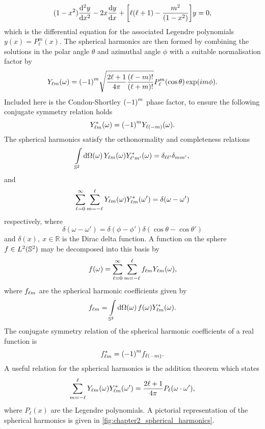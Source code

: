 %
\begin{equation}
	(1-x^{2}) \dv[2]{y}{x} - 2x\dv{y}{x} + \bigg[\ell(\ell+1) - \frac{m^{2}}{(1 - x^{2})}\bigg] y
	= 0,
\end{equation}
%
which is the differential equation for the associated Legendre polynomials \(y(x) = P^{m}_{\ell}(x)\).
The spherical harmonics are then formed by combining the solutions in the polar angle \(\theta{}\) and azimuthal angle \(\phi{}\) with a suitable normalisation factor by
%
\begin{equation}
	\pixel{\harmonic{Y}}
	= \phaseFactor \sqrt{\factor \frac{(\ell-m)!}{(\ell+m)!}} P^{m}_{\ell}(\cos{\theta}) \exp(i m\phi).
\end{equation}
%
Included here is the Condon-Shortley \(\phaseFactor{}\) phase factor, to ensure the following conjugate symmetry relation holds
%
\begin{equation}
	\pixel{\conj{\harmonic{Y}}}
	= \phaseFactor \pixel{Y_{\ell(-m)}}.
\end{equation}
%
The spherical harmonics satisfy the orthonormality and completeness relations
%
\begin{equation}\label{eq:chapter2_spherical_harmonics_orthonormal}
	\integrateSphere{\omega} \pixel{\harmonic{Y}} \pixel{\conj{\harmonic[']{Y}}}
	= \delta_{\ell\ell'} \delta_{mm'},
\end{equation}
%
and
%
\begin{equation}
	\sum\limits_{\ell=0}^{\infty} \sum\limits_{m=-\ell}^{\ell} \pixel{\harmonic{Y}} \pixel[']{\conj{\harmonic{Y}}}
	= \delta(\omega-\omega')
\end{equation}
%
respectively, where
%
\begin{equation}
	\delta(\omega-\omega')
	= \delta(\phi-\phi') \delta(\cos{\theta} - \cos{\theta'})
\end{equation}
%
and \(\delta(x),\ x \in \mathbb{R}\) is the Dirac delta function.
A function on the sphere \(f \in \hilbert{\twoSphere}\) may be decomposed into this basis by
%
\begin{equation}
	\pixel{f}
	= \sum\limits_{\ell=0}^{\infty} \sum\limits_{m=-\ell}^{\ell} \harmonic{f} \pixel{\harmonic{Y}},
\end{equation}
%
where \(\harmonic{f}\) are the spherical harmonic coefficients given by
%
\begin{equation}
	\harmonic{f}
	= \integrateSphere{\omega} \pixel{f} \pixel{\conj{\harmonic{Y}}}.
\end{equation}
%
The conjugate symmetry relation of the spherical harmonic coefficients of a real function is
%
\begin{equation}
	\conj{\harmonic{f}}
	= \phaseFactor f_{\ell(-m)}.
\end{equation}
%
A useful relation for the spherical harmonics is the addition theorem which states
%
\begin{equation}\label{eq:chapter2_addition_theorem}
	\sum\limits_{m=-\ell}^{\ell} \pixel{\harmonic{Y}} \pixel[']{\conj{\harmonic{Y}}}
	= \factor P_{\ell}(\omega \cdot \omega'),
\end{equation}
%
where \(P_{\ell}(x)\) are the Legendre polynomials.
A pictorial representation of the spherical harmonics is given in \cref{fig:chapter2_spherical_harmonics}.

